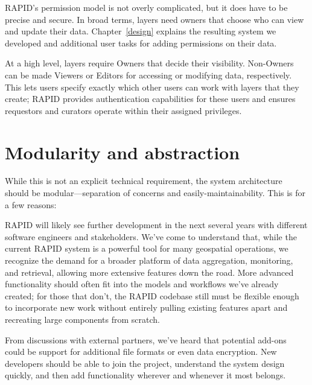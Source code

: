 RAPID's permission model is not overly complicated, but it does have to be precise and secure. In broad terms, layers need owners that choose who can view and update their data. Chapter~\ref{design} explains the resulting system we developed and additional user tasks for adding permissions on their data.

At a high level, layers require Owners that decide their visibility. Non-Owners can be made Viewers or Editors for accessing or modifying data, respectively. This lets users specify exactly which other users can work with layers that they create; RAPID provides authentication capabilities for these users and ensures requestors and curators operate within their assigned privileges.

\section{Modularity and abstraction}
While this is not an explicit technical requirement, the system architecture should be modular---separation of concerns and easily-maintainability. This is for a few reasons:

RAPID will likely see further development in the next several years with different software engineers and stakeholders. We've come to understand that, while the current RAPID system is a powerful tool for many geospatial operations, we recognize the demand for a broader platform of data aggregation, monitoring, and retrieval, allowing more extensive features down the road. More advanced functionality should often fit into the models and workflows we've already created; for those that don't, the RAPID codebase still must be flexible enough to incorporate new work without entirely pulling existing features apart and recreating large components from scratch.

From discussions with external partners, we've heard that potential add-ons could be support for additional file formats or even data encryption. New developers should be able to join the project, understand the system design quickly, and then add functionality wherever and whenever it most belongs.